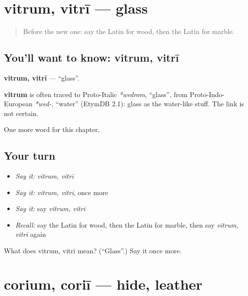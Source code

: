 \section[vitrum, vitrī]{vitrum, vitrī — glass}

\label{lesson:LA-C249-vitrum}



\begin{quote}
Before the new one: say the Latin for wood, then the Latin for marble.
\end{quote}

\subsection*{You'll want to know: vitrum, vitrī}
\textbf{vitrum, vitrī} — \textquotedblleft{}glass\textquotedblright{}.

\begin{cousinweb}
\textbf{vitrum} is often traced to Proto-Italic \emph{*wedrom}, \textquotedblleft{}glass\textquotedblright{}, from Proto-Indo-European \emph{*wed-}, \textquotedblleft{}water\textquotedblright{} (EtymDB 2.1): glass as the water-like stuff. The link is not certain.
\end{cousinweb}

\begin{grammarlens}[title={What you've built}]
One more word for this chapter.
\end{grammarlens}

\subsection*{Your turn}
\begin{itemize}
\raggedright
  \item \emph{Say it:} \emph{vitrum, vitrī}
  \item \emph{Say it:} \emph{vitrum, vitrī}, once more
  \item \emph{Say it:} say \emph{vitrum, vitrī}
  \item \emph{Recall:} say the Latin for wood, then the Latin for marble, then say \emph{vitrum, vitrī} again
\end{itemize}

\begin{tcolorbox}[breakable,colback=teal!4,colframe=teal!35!black,title={Before you move on}]
What does vitrum, vitrī mean? (\textquotedblleft{}Glass\textquotedblright{}.) Say it once more.
\end{tcolorbox}
\section[corium, coriī]{corium, coriī — hide, leather}

